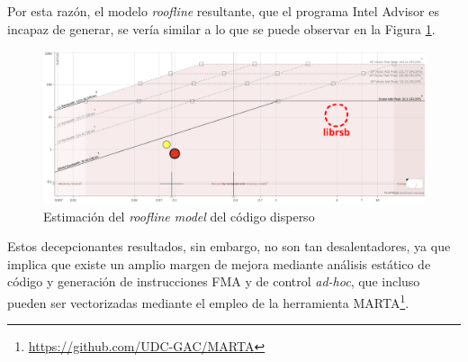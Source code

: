 Por esta razón, el modelo \textit{roofline} resultante, que el programa Intel Advisor es incapaz de generar, se vería similar a lo que se puede observar en la Figura \ref{fig:roofline_sparse_estimado}.

\begin{figure}[h!]
    \centering
    \includegraphics[width=\textwidth]{img/roofline_sparse_estimado.png}
    \caption{Estimación del \textit{roofline model} del código disperso}
    \label{fig:roofline_sparse_estimado}
\end{figure}

Estos decepcionantes resultados, sin embargo, no son tan desalentadores, ya que implica que existe un amplio margen de mejora mediante análisis estático de código y generación de instrucciones FMA y de control \textit{ad-hoc}, que incluso pueden ser vectorizadas mediante el empleo de la herramienta MARTA\footnote{\url{https://github.com/UDC-GAC/MARTA}}.